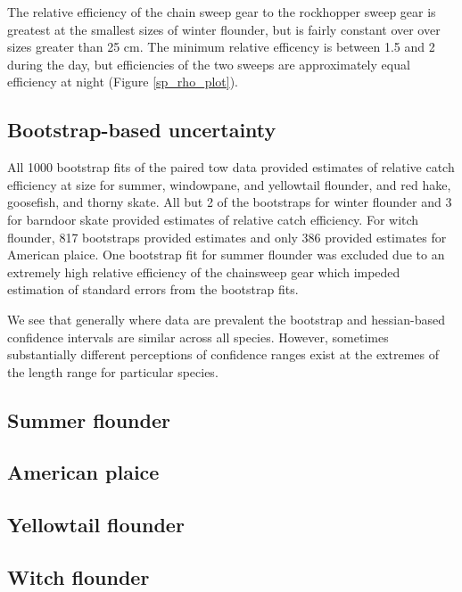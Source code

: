 \documentclass[]{article}
\begin{document}
The relative efficiency of the chain sweep gear to the rockhopper sweep
gear is greatest at the smallest sizes of winter flounder, but is fairly
constant over over sizes greater than 25 cm. The minimum relative
efficency is between 1.5 and 2 during the day, but efficiencies of the
two sweeps are approximately equal efficiency at night (Figure
\ref{sp_rho_plot}).

\hypertarget{bootstrap-based-uncertainty}{%
\subsection{Bootstrap-based
uncertainty}\label{bootstrap-based-uncertainty}}

All 1000 bootstrap fits of the paired tow data provided estimates of
relative catch efficiency at size for summer, windowpane, and yellowtail
flounder, and red hake, goosefish, and thorny skate. All but 2 of the
bootstraps for winter flounder and 3 for barndoor skate provided
estimates of relative catch efficiency. For witch flounder, 817
bootstraps provided estimates and only 386 provided estimates for
American plaice. One bootstrap fit for summer flounder was excluded due
to an extremely high relative efficiency of the chainsweep gear which
impeded estimation of standard errors from the bootstrap fits.

We see that generally where data are prevalent the bootstrap and
hessian-based confidence intervals are similar across all species.
However, sometimes substantially different perceptions of confidence
ranges exist at the extremes of the length range for particular species.

\hypertarget{summer-flounder}{%
\subsection{Summer flounder}\label{summer-flounder}}

\hypertarget{american-plaice}{%
\subsection{American plaice}\label{american-plaice}}

\hypertarget{yellowtail-flounder}{%
\subsection{Yellowtail flounder}\label{yellowtail-flounder}}

\hypertarget{witch-flounder}{%
\subsection{Witch flounder}\label{witch-flounder}}
\end{document}
